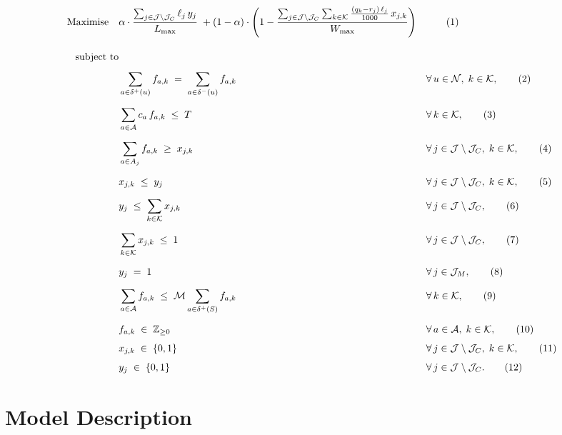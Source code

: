 \documentclass[11pt]{article}
\begin{document}
\begin{align}
\text{Maximise} \quad
& \alpha \cdot \frac{\sum_{j \in \mathcal{J} \setminus \mathcal{J}_C} \ell_j \, y_j}{L_{\max}}
\;+
(1-\alpha) \cdot \left(
1-
\frac{\sum_{j \in \mathcal{J} \setminus \mathcal{J}_C}
  \sum_{k \in \mathcal{K}}
  \frac{(q_k - r_j)\,\ell_j}{1000}\, x_{j,k}}{W_{\max}}
\right)
&& \tag{1} \label{eq:obj} \\[10pt]
%
\text{subject to} \notag \\[4pt]
%
& \sum_{a \in \delta^+(u)} f_{a,k}
  \;=\;
  \sum_{a \in \delta^-(u)} f_{a,k}
&& \forall\, u \in \mathcal{N},\; k \in \mathcal{K},
\tag{2} \label{eq:flow} \\[6pt]
%
& \sum_{a \in \mathcal{A}} c_a \, f_{a,k} \;\le\; T
&& \forall\, k \in \mathcal{K},
\tag{3} \label{eq:time} \\[6pt]
%
& \sum_{a \in A_j} f_{a,k} \;\ge\; x_{j,k}
&& \forall\, j \in \mathcal{J} \setminus \mathcal{J}_C,\;
   k \in \mathcal{K},
\tag{4} \label{eq:traverse} \\[6pt]
%
& x_{j,k} \;\le\; y_j
&& \forall\, j \in \mathcal{J} \setminus \mathcal{J}_C,\;
   k \in \mathcal{K},
\tag{5} \label{eq:link-fwd} \\[6pt]
%
& y_j \;\le\; \sum_{k \in \mathcal{K}} x_{j,k}
&& \forall\, j \in \mathcal{J} \setminus \mathcal{J}_C,
\tag{6} \label{eq:link-rev} \\[6pt]
%
& \sum_{k \in \mathcal{K}} x_{j,k} \;\le\; 1
&& \forall\, j \in \mathcal{J} \setminus \mathcal{J}_C,
\tag{7} \label{eq:single} \\[6pt]
%
& y_j \;=\; 1
&& \forall\, j \in \mathcal{J}_M,
\tag{8} \label{eq:mandatory} \\[6pt]
%
& \sum_{a \in \mathcal{A}} f_{a,k}
  \;\le\;
  \mathcal{M} \sum_{a \in \delta^+(S)} f_{a,k}
&& \forall\, k \in \mathcal{K},
\tag{9} \label{eq:depot} \\[6pt]
%
& f_{a,k} \;\in\; \mathbb{Z}_{\ge 0}
&& \forall\, a \in \mathcal{A},\; k \in \mathcal{K},
\tag{10} \label{eq:dom-f} \\[4pt]
%
& x_{j,k} \;\in\; \{0,1\}
&& \forall\, j \in \mathcal{J} \setminus \mathcal{J}_C,\;
   k \in \mathcal{K},
\tag{11} \label{eq:dom-x} \\[4pt]
%
& y_j \;\in\; \{0,1\}
&& \forall\, j \in \mathcal{J} \setminus \mathcal{J}_C.
\tag{12} \label{eq:dom-y}
\end{align}

\section{Model Description}
\end{document}
